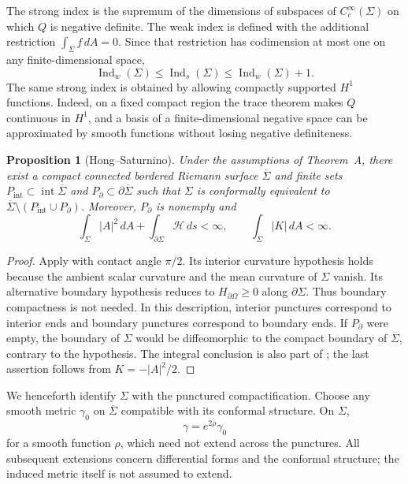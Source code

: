\documentclass[11pt]{amsart}
\numberwithin{equation}{section}
\newtheorem{proposition}[theorem]{Proposition}
\theoremstyle{definition}
\theoremstyle{remark}
\newcommand{\Sigmabar}{\overline\Sigma}
\newcommand{\dd}{\,d}
\DeclareMathOperator{\Ind}{Ind}
\begin{document}
The strong index is the supremum of the dimensions of subspaces of $C_c^\infty(\Sigma)$ on which $Q$ is negative definite. The weak index is defined with the additional restriction $\int_\Sigma f\dd A=0$. Since that restriction has codimension at most one on any finite-dimensional space,
\begin{equation}\label{eq:weak-strong}
\Ind_w(\Sigma)\le\Ind_s(\Sigma)\le\Ind_w(\Sigma)+1.
\end{equation}
The same strong index is obtained by allowing compactly supported $H^1$ functions. Indeed, on a fixed compact region the trace theorem makes $Q$ continuous in $H^1$, and a basis of a finite-dimensional negative space can be approximated by smooth functions without losing negative definiteness.

\begin{proposition}[Hong--Saturnino]\label{prop:compactification}
Under the assumptions of Theorem~A, there exist a compact connected bordered Riemann surface $\Sigmabar$ and finite sets
$P_{\mathrm{int}}\subset\operatorname{int}\Sigmabar$ and
$P_{\partial}\subset\partial\Sigmabar$ such that $\Sigma$ is conformally equivalent to $\Sigmabar\setminus(P_{\mathrm{int}}\cup P_{\partial})$. Moreover, $P_{\partial}$ is nonempty and
\begin{equation}\label{eq:finite-curvature}
\int_\Sigma |A|^2\dd A+
\int_{\partial\Sigma}\mathscr H\dd s<\infty,
\qquad
\int_\Sigma |K|\dd A<\infty.
\end{equation}
\end{proposition}
\begin{proof}
Apply \cite[Theorem~1.4]{HS23} with contact angle $\pi/2$. Its interior curvature hypothesis holds because the ambient scalar curvature and the mean curvature of $\Sigma$ vanish. Its alternative boundary hypothesis reduces to $H_{\partial\Omega}\ge0$ along $\partial\Sigma$. Thus boundary compactness is not needed. In this description, interior punctures correspond to interior ends and boundary punctures correspond to boundary ends. If $P_{\partial}$ were empty, the boundary of $\Sigma$ would be diffeomorphic to the compact boundary of $\Sigmabar$, contrary to the hypothesis. The integral conclusion is also part of \cite[Theorem~1.4]{HS23}; the last assertion follows from $K=-|A|^2/2$.
\end{proof}

We henceforth identify $\Sigma$ with the punctured compactification. Choose any smooth metric $\gamma_0$ on $\Sigmabar$ compatible with its conformal structure. On $\Sigma$,
\[
\gamma=e^{2\rho}\gamma_0
\]
for a smooth function $\rho$, which need not extend across the punctures. All subsequent extensions concern differential forms and the conformal structure; the induced metric itself is not assumed to extend.
\end{document}

